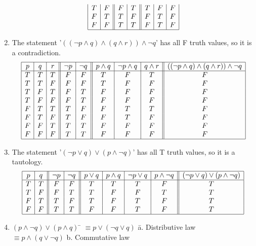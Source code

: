 \documentclass{article}
\begin{document}
\begin{enumerate}[label=\textbf{\arabic*.}]
\[\begin{array}{|c|c||c|c||c|c|c|}
T & F & F & T & T & F & F \\
F & T & T & F & F & T & F \\
F & F & T & T & F & T & F \\
\hline 
\end{array}
\]
\item %
The statement '$((\neg p \land q) \land (q \land r)) \land \neg q$' has all F truth values, so it is a contradiction.
\[
\begin{array}{|c|c|c||c|c||c|c|c||c|}
\hline
p & q & r & \neg p & \neg q & p \land q & \neg p \land q & q \land r & ((\neg p \land q) \land (q \land r)) \land \neg q\\
\hline
T & T & T & F & F & T & F & T & F \\
T & T & F & F & F & T & F & F & F \\
T & F & T & F & T & F & F & F & F \\
T & F & F & F & T & F & F & F & F \\
F & T & T & T & F & F & T & T & F \\
F & T & F & T & F & F & T & F & F \\
F & F & T & T & T & F & F & F & F \\
F & F & F & T & T & F & F & F & F \\
\hline 
\end{array}
\]
\item %
The statement '$(\neg p \lor q) \lor (p \land \neg q)$' has all T truth values, so it is a tautology.
\[
\begin{array}{|c|c||c|c||c|c|c|c||c|}
\hline
p & q & \neg p & \neg q & p \lor q & p \land q & \neg p \lor q & p \land \neg q & (\neg p \lor q) \lor (p \land \neg q)\\
\hline
T & T & F & F & T & T & T & F & T \\
T & F & F & T & T & F & F & T & T \\
F & T & T & F & T & F & T & F & T \\
F & F & T & T & F & F & T & F & T \\
\hline 
\end{array}
\]
\item %
\begin{tabbing}
$(p \land \neg q) \lor (p \land q)$ \= $\equiv p \lor (\neg q \lor q)$ \hspace{2.8cm} \= a. Distributive law\\
\> $\equiv p \land (q \lor \neg q)$ \> b. Commutative law\\

\end{tabbing}
\end{enumerate}
\end{document}
